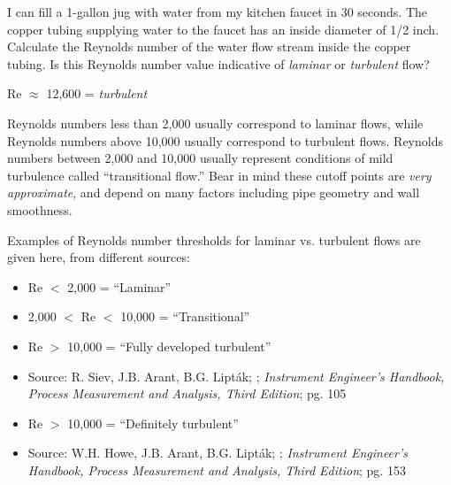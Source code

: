 

I can fill a 1-gallon jug with water from my kitchen faucet in 30 seconds.  The copper tubing supplying water to the faucet has an inside diameter of 1/2 inch.  Calculate the Reynolds number of the water flow stream inside the copper tubing.  Is this Reynolds number value indicative of {\it laminar} or {\it turbulent} flow?







Re $\approx$ 12,600 = {\it turbulent}

\vskip 10pt

Reynolds numbers less than 2,000 usually correspond to laminar flows, while Reynolds numbers above 10,000 usually correspond to turbulent flows.  Reynolds numbers between 2,000 and 10,000 usually represent conditions of mild turbulence called ``transitional flow.''  Bear in mind these cutoff points are {\it very approximate}, and depend on many factors including pipe geometry and wall smoothness.

Examples of Reynolds number thresholds for laminar vs. turbulent flows are given here, from different sources:

\begin{itemize}
\goodbreak
\item{} Re $<$ 2,000 = ``Laminar''
\item{} 2,000 $<$ Re $<$ 10,000 = ``Transitional''
\item{} Re $>$ 10,000 = ``Fully developed turbulent''
\item{} Source: R. Siev, J.B. Arant, B.G. Lipt\'ak; ; {\it Instrument Engineer's Handbook, Process Measurement and Analysis, Third Edition}; pg. 105
\end{itemize}

\begin{itemize}
\goodbreak
\item{} Re $>$ 10,000 = ``Definitely turbulent''
\item{} Source: W.H. Howe, J.B. Arant, B.G. Lipt\'ak; ; {\it Instrument Engineer's Handbook, Process Measurement and Analysis, Third Edition}; pg. 153
\end{itemize}

